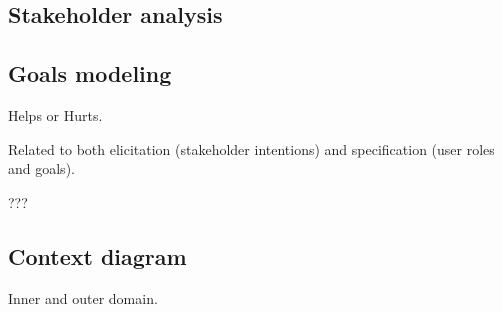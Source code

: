 \subsection{Stakeholder analysis}

\subsection{Goals modeling}

Helps or Hurts.

Related to both elicitation (stakeholder intentions) and specification (user roles and goals).

???

\subsection{Context diagram}

Inner and outer domain.






